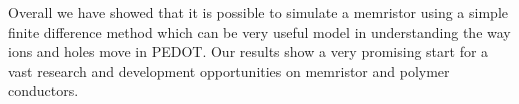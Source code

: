 Overall we have showed that it is possible to simulate a memristor using a simple finite difference method which can be very useful model in understanding the way ions and holes move in PEDOT. Our results show a very promising start for a vast research and development opportunities on memristor and polymer conductors.



